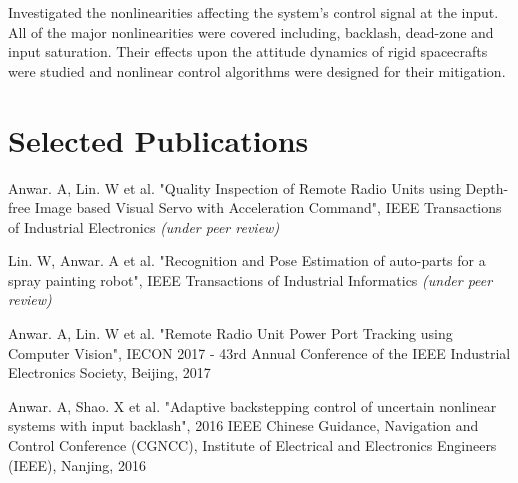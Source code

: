 \documentclass[a4paper]{deedy-resume} %
\begin{document}
\begin{minipage}[t]{0.66\textwidth}
Investigated the nonlinearities affecting the system's control signal at the input. All of the major nonlinearities were covered including, backlash, dead-zone and input saturation. Their effects upon the attitude dynamics of rigid spacecrafts were studied and nonlinear control algorithms were designed for their mitigation.

\sectionspace %


\section{Selected Publications}

\vspace{\topsep} %

\begin{tightitemize}
	\item Anwar. A, Lin. W et al. "Quality Inspection of Remote Radio Units using Depth-free Image based Visual Servo with Acceleration Command", IEEE Transactions of Industrial Electronics \textit{(under peer review)}
	
	\item Lin. W, Anwar. A et al. "Recognition and Pose Estimation of auto-parts for a spray painting robot", IEEE Transactions of Industrial Informatics \textit{(under peer review)}
	
	
	\item Anwar. A, Lin. W et al. "Remote Radio Unit Power Port Tracking using Computer Vision", IECON 2017 - 43rd Annual Conference of the IEEE Industrial Electronics Society, Beijing, 2017
	
	\item Anwar. A, Shao. X et al. "Adaptive backstepping control of uncertain nonlinear systems with input backlash", 2016 IEEE Chinese Guidance, Navigation and Control Conference (CGNCC), Institute of Electrical and Electronics Engineers (IEEE), Nanjing, 2016
\end{tightitemize}


\end{minipage}
\end{document}
